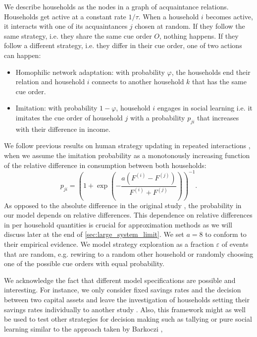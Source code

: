 We describe households as the nodes in a graph of acquaintance relations. Households get active at a constant rate $1/\tau$. When a household $i$ becomes active, it interacts with one of its acquaintances $j$ chosen at random. If they follow the same strategy, i.e. they share the same cue order $O$, nothing happens. If they follow a different strategy, i.e. they differ in their cue order, one of two actions can happen:
\begin{itemize}
	\item Homophilic network adaptation: with probability $\varphi$, the households end their relation and household $i$ connects to another household $k$ that has the same cue order. 
	\item Imitation: with probability $1-\varphi$, household $i$ engages in social learning i.e. it imitates the cue order of household $j$ with a probability $p_{ji}$ that increases with their difference in income.
\end{itemize}
We follow previous results on human strategy updating in repeated interactions \cite{Traulsen2010}, when we assume the imitation probability as a monotonously increasing function of the relative difference in consumption between both households:
\begin{equation}
	p_{ji} =  \left(1 + \exp \left(- \frac{a(F^{(i)} - F^{(j)})}{F^{(i)} + F^{(j)}} \right) \right)^{-1}.
    \label{eq:imitation_probability}
\end{equation}
As opposed to the absolute difference in the original study \cite{Traulsen2010}, the probability in our model depends on relative differences. This dependence on relative differences in per household quantities is crucial for approximation methods as we will discuss later at the end of \ref{sec:large_system_limit}.
We set $a = 8$ to conform to their empirical evidence.
We model strategy exploration as a fraction $\varepsilon$ of events that are random, e.g. rewiring to a random other household or randomly choosing one of the possible cue orders with equal probability.

We acknowledge the fact that different model specifications are possible and interesting.
For instance, we only consider fixed savings rates and the decision between two capital assets and leave the investigation of households setting their savings rates individually to another study \cite{Asano2018}.
Also, this framework might as well be used to test other strategies for decision making such as tallying or pure social learning similar to the approach taken by Barkoczi \cite{Barkoczi2013}, \cite{Barkoczi2016}

